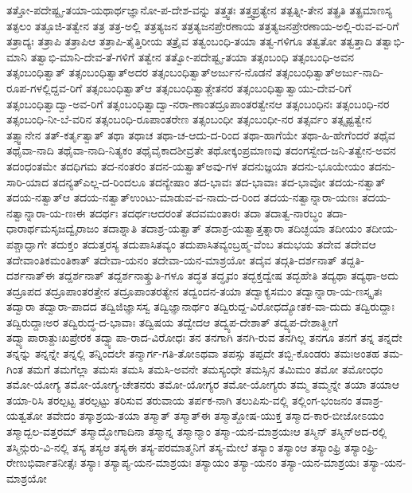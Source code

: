 {ತತ್ತೋ-ಪದೇಷ್ಟೃ-ತಯಾ-ಯಥಾರ್ಥಜ್ಞಾನೋ-ಪ-ದೇಶ-ವನ್ನು
ತತ್ತ್ವತಃ
ತತ್ತ್ವಪ್ರತ್ಯೇನ
ತತ್ಪತ್ನೀ-ತೇನ
ತತ್ಪ್ರತಿ
ತತ್ಪ್ರಮಾಣಸ್ಯ
ತತ್ಫಲಂ
ತತ್ಫೂಜಿ-ತತ್ವೇನ
ತತ್ರ
ತತ್ರ-ಅಲ್ಲಿ
ತತ್ರತ್ಯಜನ
ತತ್ರತ್ಯಜನಪ್ರೇರಣಾಯ
ತತ್ರತ್ಯಜನಪ್ರೇರಣಾಯ-ಅಲ್ಲಿ-ರುವ-ವ-ರಿಗೆ
ತತ್ರಾದ್ಯಃ
ತತ್ರಾಪಿ
ತತ್ರಾಪಿಆ
ತತ್ರಾಪಿ-ತೈತ್ತಿರೀಯ
ತತ್ರೈವ
ತತ್ವಂಬಂಧಿ-ತಯಾ
ತತ್ವ-ಗಳಿಗೂ
ತತ್ವತೋ
ತತ್ವತ್ತಾದಿ
ತತ್ವಾಭಿ-ಮಾನಿ
ತತ್ವಾಭಿ-ಮಾನಿ-ದೇವ-ತೆ-ಗಳಿಗೆ
ತತ್ವೇನ
ತತ್ವೋ-ಪದೇಷ್ಟೃ-ತಯಾ
ತತ್ಸಂಬಂಧಿ
ತತ್ಸಂಬಂಧಿ-ಅವನ
ತತ್ಸಂಬಂಧಿತ್ವಾತ್
ತತ್ಸಂಬಂಧಿತ್ವಾತ್ಅದರ
ತತ್ಸಂಬಂಧಿತ್ವಾತ್ಅರ್ಜುನ-ನೊಡನೆ
ತತ್ಸಂಬಂಧಿತ್ವಾತ್ಅರ್ಜು-ನಾದಿ-ರೂಪ-ಗಳಲ್ಲಿದ್ದವ-ರಿಗೆ
ತತ್ಸಂಬಂಧಿತ್ವಾತ್ಆ
ತತ್ಸಂಬಂಧಿತ್ವಾತ್ಚೇತನರ
ತತ್ಸಂಬಂಧಿತ್ವಾತ್ವಾಯು-ದೇವ-ರಿಗೆ
ತತ್ಸಂಬಂಧಿತ್ವಾದ್ವಾ-ಅವ-ರಿಗೆ
ತತ್ಸಂಬಂಧಿತ್ವಾದ್ವಾ-ನರಾ-ಣಾಂತದ್ರೂಪಾಂತರತ್ವೇನಆ
ತತ್ಸಂಬಂಧಿನಃ
ತತ್ಸಂಬಂಧಿ-ನರ
ತತ್ಸಂಬಂಧಿ-ನೀ-ಬೆ-ವರಿನ
ತತ್ಸಂಬಂಧಿ-ರೂಪಾಂತರೇಣ
ತತ್ಸಂಬಂಧೀ
ತತ್ಸಂಬಂಧೀ-ನರ
ತತ್ಸರ್ವಂ
ತತ್ಸೃಷ್ಟತ್ವೇನ
ತತ್ಸ್ವಾನೇನ
ತತ್-ಕರ್ತೃತ್ವಾತ್
ತಥಾ
ತಥಾಚ
ತಥಾ-ಚ-ಆದು-ದ-ರಿಂದ
ತಥಾ-ಹಾಗೆಯೇ
ತಥಾ-ಹಿ-ಹೇಗೆಂದರೆ
ತಥೈವ
ತಥೈವಾ-ನಾದಿ
ತಥೈವಾ-ನಾದಿ-ನಿತ್ಯಕಂ
ತಥೈವೈಕಾದಶೀವ್ರತೇ
ತಥೋಕ್ಕಂಪ್ರಮಾಣವು
ತದಂಗಸ್ವೇದ-ಜನಿ-ತತ್ವೇನ-ಅವನ
ತದಂಧಂತಮೇ
ತದಧಿಗಮ
ತದ-ನಂತರಂ
ತದನ-ಯತ್ವಾತ್ಅವು-ಗಳ
ತದನುಜ್ಞಯಾ
ತದನು-ಭೂಯೇಯಂ
ತದನು-ಸಾರಿ-ಯಾದ
ತದನ್ಯತ್ಎಲ್ಲ-ದ-ರಿಂದಲೂ
ತದನ್ಯೇಷಾಂ
ತದ-ಭಾವಃ
ತದ-ಭಾವಾಃ
ತದ-ಭಾವೋ
ತದಯ-ನತ್ವಾತ್
ತದಯ-ನತ್ವಾತ್ಆ
ತದಯ-ನತ್ವಾತ್ಉಂಟು-ಮಾಡುವ-ವ-ನಾದು-ದ-ರಿಂದ
ತದಯ-ನತ್ವಾನ್ನಾರಾ-ಯಣಃ
ತದಯ-ನತ್ವಾನ್ನಾರಾ-ಯ-ಣಃಈ
ತದರ್ಥಃ
ತದರ್ಥಃಆದರಂತೆ
ತದವಮಂತಾರಃ
ತದಾ
ತದಾತ್ವ-ನಾರಬ್ಧಂ
ತದಾ-ಧಾರಾರ್ಥಮಸೃಜದ್ವೈರಾಜಂ
ತದಾಶ್ನಾತಿ
ತದಾಶ್ರ-ಯತ್ವಾತ್
ತದಾಶ್ರ-ಯತ್ವಾತ್ತತ್ನಾರಾ
ತದಿಚ್ಛಯಾ
ತದೀಯಂ
ತದೀಯ-ಪಶ್ಚಾದ್ಘಾಗೇ
ತದುಕ್ತಂ
ತದುತ್ತರಸ್ಯ
ತದುಪಾಸಿತವ್ಯಂ
ತದುಪಾಸಿತವ್ಯಂಬ್ರಹ್ಮ-ವೆಂಬ
ತದುಭಯ
ತದೇವ
ತದೇವಆ
ತದೇವಾಂತಿಕಮಂತಿಕಾತ್
ತದೇವಾ-ಯನಂ
ತದೇವಾ-ಯನ-ಮಾಶ್ರಯೋ
ತದೈವ
ತದ್ಗತಿ-ದರ್ಶನಾತ್
ತದ್ದತಿ-ದರ್ಶನಾತ್ಈ
ತದ್ದರ್ಶನಾತ್
ತದ್ದರ್ಶನಾತ್ಶ್ರುತಿ-ಗಳೂ
ತದ್ಧತ
ತದ್ಧೃವಂ
ತದ್ಭಕ್ತದ್ವೇಷ
ತದ್ಭಹೇತಿ
ತದ್ಯಥಾ
ತದ್ಯಥಾ-ಅದು
ತದ್ರೂಪದ
ತದ್ರೂಪಾಂತರತ್ತೇನ
ತದ್ರೂಪಾಂತರತ್ಯೇನ
ತದ್ವಂದನ-ತಯಾ
ತದ್ವಾಕ್ಯಸಮಂ
ತದ್ವಾನ್ನಾರಾ-ಯ-ಣಸ್ಕೃತಃ
ತದ್ವಾರಾ
ತದ್ವಾರಾ-ಪಾದದ
ತದ್ವಿಜಿಜ್ಞಾಸಸ್ವ
ತದ್ವಿಜ್ಞಾನಾರ್ಥಂ
ತದ್ವಿರುದ್ದ-ವಿರೋಧದ್ಯೋತಕ-ವಾ-ದುದು
ತದ್ವಿರುದ್ದಾಃ
ತದ್ವಿರುದ್ದಾಃಅರ
ತದ್ವಿರುದ್ಧ-ದ-ಭಾವಾಃ
ತದ್ವಿಷಯ
ತದ್ವೇದಆ
ತದ್ವ್ಯಪ-ದೇಶಾತ್
ತದ್ವ್ಯಪ-ದೇಶಾತ್ಹೀಗೆ
ತದ್ವ್ಯಾಪಾರಾತ್ದುಃಖಪ್ರೇರಕ
ತದ್ವ್ಯಾಪಾ-ರಾದ-ವಿರೋಧಃ
ತನ
ತನಗಾಗಿ
ತನಗಿ-ರುವ
ತನಗಿಲ್ಲ
ತನಗೂ
ತನಗೆ
ತನ್ನ
ತನ್ನದೇ
ತನ್ನನ್ನು
ತನ್ನನ್ನೇ
ತನ್ನಲ್ಲಿ
ತನ್ನಿಂದಲೇ
ತನ್ಮಾರ್ಗ-ಗತಿ-ತೋಽಥವಾ
ತಪಸ್ಸು
ತಪ್ಪದೇ
ತಬ್ಬಿ-ಕೊಂಡರು
ತಮಃಅಂತಹ
ತಮ-ಗಿಂತ
ತಮಗೆ
ತಮಗೆಲ್ಲಾ
ತಮಸಃ
ತಮಸಿ
ತಮಸಿ-ಅವನೇ
ತಮಸ್ಯಂಧೇ
ತಮಸ್ಸಿನ
ತಮಿಮಂ
ತಮೋ
ತಮೋಂಧಂ
ತಮೋ-ಯೋಗ್ಯ
ತಮೋ-ಯೋಗ್ಯ-ಚೇತನರು
ತಮೋ-ಯೋಗ್ಯರ
ತಮೋ-ಯೋಗ್ಯರು
ತಮ್ಮ
ತಮ್ಮನ್ನೇ
ತಯಾ
ತಯಾಆ
ತಯಾ-ರಿಸಿ
ತರಲ್ಪಟ್ಟ
ತರಲ್ಪಟ್ಟು
ತರಿಸುವ
ತರುವಾಯ
ತರ್ಪಕ-ನಾಗಿ
ತಲುಪಿಸು-ವಲ್ಲಿ
ತಲ್ಲಿಂಗ-ಭಂಜನಂ
ತವಾಶ್ರ-ಯತ್ವತೋ
ತವೇದಂ
ತಸ್ಕಾಶ್ರಯ-ತಯಾ
ತಸ್ಮಾತ್
ತಸ್ಮಾತ್ಈ
ತಸ್ಮಾತ್ದೋಷ-ಯುಕ್ತ
ತಸ್ಮಾದ-ಕಾರ-ಬೀಜೋಽಯಂ
ತಸ್ಮಾದ್ಬಲ-ವತ್ತರಮ್
ತಸ್ಮಾದ್ಭೋಗಾದಿನಾ
ತಸ್ಮಾನ್ನ
ತಸ್ಮಾನ್ಮಾಂ
ತಸ್ಮಾ-ಯನ-ಮಾಶ್ರಯಃಆ
ತಸ್ಮಿನ್
ತಸ್ಮಿನ್ಅದ-ರಲ್ಲಿ
ತಸ್ಮಿನ್ಗುರು-ವಿ-ನಲ್ಲಿ
ತಸ್ಯ
ತಸ್ಯಆ
ತಸ್ಯಈ
ತಸ್ಯ-ಪರಮಾತ್ಮನಿಗೆ
ತಸ್ಯ-ಮೇಲೆ
ತಸ್ಯಾಂ
ತಸ್ಯಾಂಆ
ತಸ್ಯಾಂಫ್ರಿ
ತಸ್ಯಾಂಫ್ರಿ-ರೇಣುಭಿರ್ವಾತನೀತ್ಸೆಃ
ತಸ್ಯಾಃ
ತಸ್ಯಾಪ್ಯ-ಯನ-ಮಾಶ್ರಯಃ
ತಸ್ಯಾಯಂ
ತಸ್ಯಾ-ಯನಂ
ತಸ್ಯಾ-ಯನ-ಮಾಶ್ರಯಃ
ತಸ್ಯಾ-ಯನ-ಮಾಶ್ರಯೋ
}
